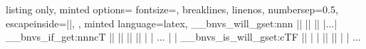 \begin{tcblisting} {
  listing only,
  minted options={
    fontsize=\small,
    breaklines,
    linenos,
    numbersep=0.5\baselineskip,
    escapeinside=||,
  },
  minted language=latex,
}
\__bnvs_will_gset:nnn || || ||
|...|
\__bnvs_if_get:nnncT || || || || {
| | ...
| | \__bnvs_is_will_gset:cTF || {
| |   || } { || }
| | ...
}
\end{tcblisting}
